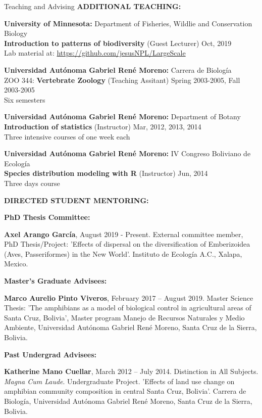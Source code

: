 \documentclass{resume} %
\begin{document}
\begin{rSection}{Teaching and Advising}
\textbf{ADDITIONAL TEACHING:}

{\bf University of Minnesota: }{Department of Fisheries, Wildlie and Conservation Biology } \\
\textbf{Introduction to patterns of biodiversity} (Guest Lecturer) \hfill Oct, 2019 \\
{Lab material at:
\url{https://github.com/jesusNPL/LargeScale}}\smallskip 

{\bf Universidad Autónoma Gabriel René Moreno: }{Carrera de Biología } \\
ZOO 344: \textbf{Vertebrate Zoology} (Teaching Assitant) \hfill Spring 2003-2005, Fall 2003-2005 \\
{Six semesters}\smallskip 

{\bf Universidad Autónoma Gabriel René Moreno: }{Department of Botany } \\
\textbf{Introduction of statistics} (Instructor) \hfill Mar, 2012, 2013, 2014 \\
{Three intensive courses of one week each}\smallskip 

{\bf Universidad Autónoma Gabriel René Moreno: }{IV Congreso Boliviano de Ecología } \\
\textbf{Species distribution modeling with R} (Instructor) \hfill Jun, 2014 \\
{Three days course}\smallskip 

\textbf{DIRECTED STUDENT MENTORING:}

\textbf{PhD Thesis Committee:}

\textbf{Axel Arango García}, August 2019 - Present. External committee member, PhD Thesis/Project: 'Effects of dispersal on the diversification of Emberizoidea (Aves, Passeriformes) in the New World'. Instituto de Ecología A.C., Xalapa, Mexico. 

\textbf{Master's Graduate Advisees:}

\textbf{Marco Aurelio Pinto Viveros}, February 2017 – August 2019. Master Science Thesis: 'The amphibians as a model of biological control in agricultural areas of Santa Cruz, Bolivia', Master program Manejo de Recursos Naturales y Medio Ambiente, Universidad Autónoma Gabriel René Moreno, Santa Cruz de la Sierra, Bolivia.

\textbf{Past Undergrad Advisees:}

\textbf{Katherine Mano Cuellar}, March 2012 – July 2014. Distinction in All Subjects. {\em Magna Cum Laude}. Undergraduate Project. 'Effects of land use change on amphibian community composition in central Santa Cruz, Bolivia'. Carrera de Biología, Universidad Autónoma Gabriel René Moreno, Santa Cruz de la Sierra, Bolivia.


\end{rSection}
\end{document}
